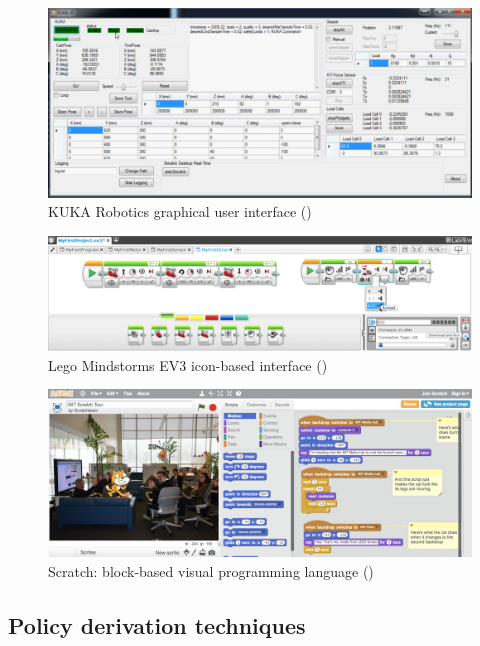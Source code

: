 \begin{figure}[!h]
	\centering
	\includegraphics[width=0.99\linewidth]{figures/kuka-interface2}
	\caption{KUKA Robotics graphical user interface (\cite{abdeetedal2017kuka})}
	\label{fig:Kuka}
\end{figure} 
\begin{figure}[!h]
	\centering
	\includegraphics[width=0.94\linewidth]{figures/lego-mindstorm2}
	\caption{Lego Mindstorms EV3 icon-based interface (\cite{lego2003})}
	\label{fig:lego-mindstorm}
\end{figure} 
\begin{figure}[!h]
	\centering
	\includegraphics[width=0.94\linewidth]{figures/scratch-interface}
	\caption{Scratch: block-based visual programming language (\cite{majed2014learn})}
	\label{fig:scratch-interface}
\end{figure} 

\subsection{Policy derivation techniques}
